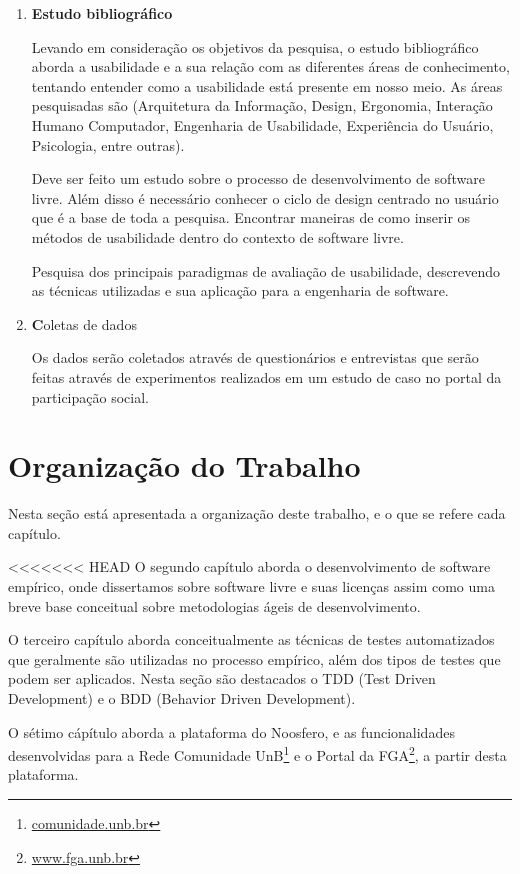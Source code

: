 	\begin{enumerate}
	\item \textbf{Estudo bibliográfico}

	Levando em consideração os objetivos da pesquisa, o estudo bibliográfico aborda a usabilidade e a sua relação com as diferentes áreas de conhecimento, tentando entender como a usabilidade está presente em nosso meio. As áreas pesquisadas são (Arquitetura da Informação, Design, Ergonomia, Interação Humano Computador, Engenharia de Usabilidade, Experiência do Usuário, Psicologia, entre outras).

Deve ser feito um estudo sobre o processo  de desenvolvimento de software livre. Além disso é necessário conhecer o ciclo de design centrado no usuário que é a base de toda a pesquisa. Encontrar maneiras de como inserir os métodos de usabilidade dentro do contexto de software livre. 

	Pesquisa dos principais paradigmas de avaliação de usabilidade, descrevendo as técnicas utilizadas e sua aplicação para a engenharia de software.

	\item \textbf Coletas de dados

	Os dados serão coletados através de questionários e entrevistas que serão feitas através de experimentos realizados em um estudo de caso no portal da participação social.

	\end{enumerate}

	\section{Organização do Trabalho}

	Nesta seção está apresentada a organização deste trabalho, e o que se refere cada capítulo.
	
<<<<<<< HEAD
	O segundo capítulo aborda o desenvolvimento de software empírico, onde dissertamos sobre software livre e suas licenças assim como uma breve base conceitual sobre metodologias ágeis de desenvolvimento.
	
	O terceiro capítulo aborda conceitualmente as técnicas de testes automatizados que geralmente são utilizadas no processo empírico, além dos tipos de testes que podem ser aplicados. Nesta seção são destacados o TDD (Test Driven Development) e o BDD (Behavior Driven Development).
	
	O sétimo cápítulo aborda a plataforma do Noosfero, e as funcionalidades desenvolvidas para a Rede Comunidade UnB\footnote{\url{comunidade.unb.br}} e o Portal da FGA\footnote{\url{www.fga.unb.br}}, a partir desta plataforma.
	
